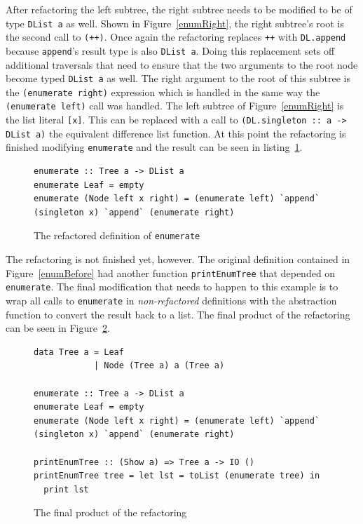 After refactoring the left subtree, the right subtree needs to be modified to be of type \texttt{DList a} as well. Shown in Figure~\ref{enumRight}, the right subtree's root is the second call to \texttt{(++)}. Once again the refactoring replaces \texttt{++} with \texttt{DL.append} because \texttt{append}'s result type is also \texttt{DList a}. Doing this replacement sets off additional traversals that need to ensure that the two arguments to the root node become typed \texttt{DList a} as well. The right argument to the root of this subtree is the \texttt{(enumerate right)} expression which is handled in the same way the \texttt{(enumerate left)} call was handled. The left subtree of Figure~\ref{enumRight}  is the list literal \texttt{[x]}. This can be replaced with a call to \texttt{(DL.singleton :: a -> DList a)} the equivalent difference list function. At this point the refactoring is finished modifying \texttt{enumerate} and the result can be seen in listing~\ref{enumRef}.

\begin{figure}[t]
\begin{lstlisting}
enumerate :: Tree a -> DList a
enumerate Leaf = empty
enumerate (Node left x right) = (enumerate left) `append` (singleton x) `append` (enumerate right)
\end{lstlisting}
\caption{The refactored definition of \texttt{enumerate}}
\label{enumRef}
\end{figure}

The refactoring is not finished yet, however. The original definition contained in Figure~\ref{enumBefore} had another function \texttt{printEnumTree} that depended on \texttt{enumerate}. The final modification that needs to happen to this example is to wrap all calls to \texttt{enumerate} in \textit{non-refactored} definitions with the abstraction function to convert the result back to a list. The final product of the refactoring can be seen in Figure~\ref{enumFinal}.

\begin{figure}[t]
\begin{lstlisting}
data Tree a = Leaf
            | Node (Tree a) a (Tree a)

enumerate :: Tree a -> DList a
enumerate Leaf = empty
enumerate (Node left x right) = (enumerate left) `append` (singleton x) `append` (enumerate right)

printEnumTree :: (Show a) => Tree a -> IO ()
printEnumTree tree = let lst = toList (enumerate tree) in
  print lst
\end{lstlisting}
\caption{The final product of the refactoring}
\label{enumFinal}
\end{figure}

